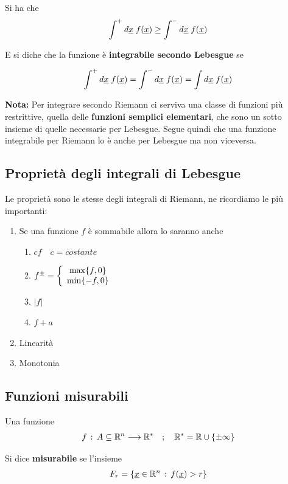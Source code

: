 Si ha che
\begin{align}
	\int^+ d\underline{x} \; f(\underline{x}) \geq \int^- d\underline{x} \; f(\underline{x})
\end{align}

E si diche che la funzione è \textbf{integrabile secondo Lebesgue} se

\begin{align}
	\int^+ d\underline{x} \; f(\underline{x}) = \int^- d\underline{x} \; f(\underline{x}) = \int d\underline{x} \; f(\underline{x})
\end{align}

\textbf{Nota:} Per integrare secondo Riemann ci serviva una classe di funzioni più restrittive, quella delle \textbf{funzioni semplici elementari}, che sono un sotto insieme di quelle necessarie per Lebesgue. Segue quindi che una funzione integrabile per Riemann lo è anche per Lebesgue ma non viceversa.

\newpage

\subsection{Proprietà degli integrali di Lebesgue}

Le proprietà sono le stesse degli integrali di Riemann, ne ricordiamo le più importanti:
\begin{enumerate}
	\item Se una funzione $f$ è sommabile allora lo saranno anche
	\begin{enumerate}
		\item $cf \quad c=costante$
		\item $f^{\pm}= \left\{\begin{array}{cc} \max\{ f,0\} \\ \min\{ -f,0\} \end{array}\right.$
		\item $|f|$
		\item $f + a$
	\end{enumerate}
	\item Linearità
	\item Monotonia
\end{enumerate}

\subsection{Funzioni misurabili}

Una funzione
\begin{align}
	f \, : \, A\subseteq \mathbb{R}^{n} \longrightarrow \mathbb{R}^{*} \quad ; \quad \mathbb{R}^* = \mathbb{R} \cup \{ \pm \infty \}
\end{align}

Si dice \textbf{misurabile} se l'insieme
\begin{align}
	F_r = \{\underline{x} \in \mathbb{R}^n \, : \, f(\underline{x})>r\}
\end{align}

